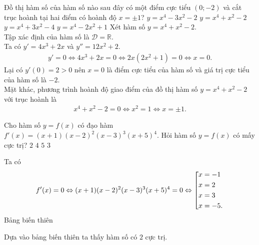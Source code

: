 \begin{ex}%
 Đồ thị hàm số của hàm số nào sau đây có một điểm cực tiểu $(0;-2)$ và cắt trục hoành tại hai điểm có hoành độ $x = \pm 1$?
 \choice
  {$y = x^4 - 3x^2 - 2$}
  {\True $y = x^4 + x^2 - 2$}
  {$y = x^4 + 3x^2 - 4$}
  {$y = x^4 - 2x^2 + 1$}
 \loigiai
  {
  Xét hàm số $y = x^4 + x^2 - 2$.\\
  Tập xác định của hàm số là $\mathscr{D} = \mathbb{R}$.\\
  Ta có $y' = 4x^3 + 2x$ và $y'' = 12x^2 + 2$.
  \begin{eqnarray*}
   y' = 0 \Leftrightarrow 4x^3 + 2x = 0 \Leftrightarrow 2x(2x^2+1) = 0 \Leftrightarrow x = 0.
  \end{eqnarray*}
  Lại có $y'(0) = 2 > 0$ nên $x = 0$ là điểm cực tiểu của hàm số và giá trị cực tiểu của hàm số là $-2$.\\
  Mặt khác, phương trình hoành độ giao điểm của đồ thị hàm số $y=x^4+x^2-2$ với trục hoành là
  \begin{eqnarray*}
   x^4 + x^2 - 2 = 0 \Leftrightarrow x^2 = 1 \Leftrightarrow x = \pm 1.
  \end{eqnarray*}
  }
\end{ex}

\begin{ex}%
 Cho hàm số $y = f(x)$ có đạo hàm $f'(x) = (x+1)(x-2)^2(x-3)^3(x+5)^4$. Hỏi hàm số $y = f(x)$ có mấy cực trị?
 \choice
  {\True $2$}
  {$4$}
  {$5$}
  {$3$}
 \loigiai
  {
  Ta có
  \begin{eqnarray*}
   f'(x) = 0 \Leftrightarrow (x+1)(x-2)^2(x-3)^3(x+5)^4 = 0 \Leftrightarrow \left[\begin{aligned}& x = -1 \\& x = 2 \\& x = 3 \\& x = -5.\end{aligned}\right.
  \end{eqnarray*}
  Bảng biến thiên
  \begin{center}
  \end{center}
  Dựa vào bảng biến thiên ta thấy hàm số có $2$ cực trị.
  }
\end{ex}

